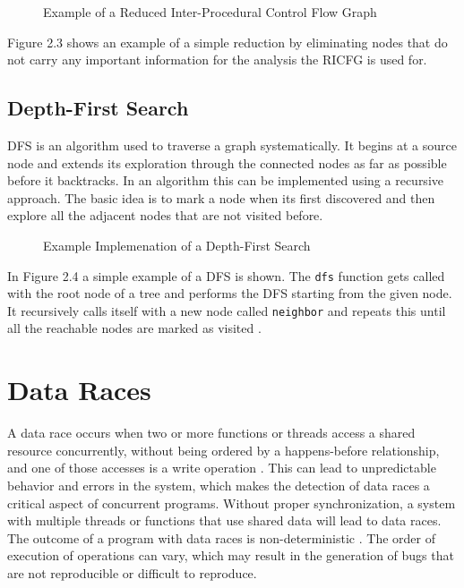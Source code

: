 \documentclass[
fancyheadings, %
%
%
]{stsreprt}
\begin{document}
{\begin{figure}[H]
\begin{tikzpicture}[node distance=2cm, scale=0.75, transform shape]
			\end{tikzpicture}
			\caption{Example of a Reduced Inter-Procedural Control Flow Graph}
		\end{figure}
		
		Figure 2.3 shows an example of a simple reduction by eliminating nodes that do not carry any important information for the analysis the RICFG is used for. 
		 
		\subsection{Depth-First Search}
		\ac{DFS} is an algorithm used to traverse a graph systematically. It begins at a source node and extends its exploration through the connected nodes as far as possible before it backtracks. In an algorithm this can be implemented using a recursive approach. The basic idea is to mark a node when its first discovered and then explore all the adjacent nodes that are not visited before. 
		\begin{figure}[H]
			\centering
		\begin{algorithm}[H]
			\SetAlgoLined
			
		\end{algorithm}
		\caption{Example Implemenation of a Depth-First Search}
		\end{figure}
		In Figure 2.4 a simple example of a \ac{DFS} is shown. The \texttt{dfs} function gets called with the root node of a tree and performs the \ac{DFS} starting from the given node. It recursively calls itself with a new node called \texttt{neighbor} and repeats this until all the reachable nodes are marked as visited \cite{mehl2008}.
		
		
		\section{Data Races}
		
		A data race occurs when two or more functions or threads access a shared resource concurrently, without being ordered by a happens-before relationship, and one of those accesses is a write operation \cite{chen2011}. This can lead to unpredictable behavior and errors in the system, which makes the detection of data races a critical aspect of concurrent programs. Without proper synchronization, a system with multiple threads or functions that use shared data will lead to data races. The outcome of a program with data races is non-deterministic \cite{chen2011}. The order of execution of operations can vary, which may result in the generation of bugs that are not reproducible or difficult to reproduce. 
		
}
\end{document}
